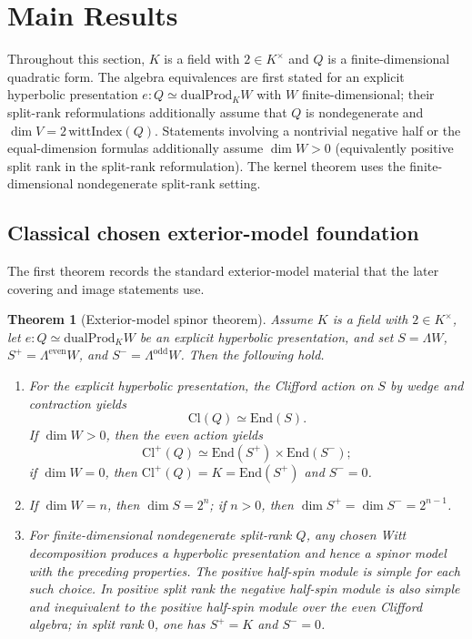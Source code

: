 \documentclass{birkjour}
\theoremstyle{plain}
\newtheorem{theorem}{Theorem}[section]
\theoremstyle{definition}
\theoremstyle{remark}
\newcommand{\Cl}{\mathrm{Cl}}
\newcommand{\End}{\mathrm{End}}
\newcommand{\dualProd}{\mathrm{dualProd}}
\newcommand{\wedgeW}{\Lambda W}
\newcommand{\wedgeEven}{\Lambda^{\mathrm{even}} W}
\newcommand{\wedgeOdd}{\Lambda^{\mathrm{odd}} W}
\begin{document}
\section{Main Results}
\label{sec:results}

Throughout this section, $K$ is a field with $2\in K^\times$ and $Q$ is a
finite-dimensional quadratic form. The algebra equivalences are first stated
for an explicit hyperbolic presentation $e:Q \simeq \dualProd_K W$ with
$W$ finite-dimensional; their split-rank reformulations additionally assume
that $Q$ is nondegenerate and $\dim V = 2\,\mathrm{wittIndex}(Q)$. Statements
involving a nontrivial negative half or the equal-dimension formulas
additionally assume $\dim W>0$ (equivalently positive split rank in the
split-rank reformulation). The kernel theorem uses the finite-dimensional
nondegenerate split-rank setting.

\subsection*{Classical chosen exterior-model foundation}

The first theorem records the standard exterior-model material that the later
covering and image statements use.

\begin{theorem}[Exterior-model spinor theorem]
\label{thm:chosen-spinor-package}
Assume $K$ is a field with $2\in K^\times$, let
$e:Q \simeq \dualProd_K W$ be an explicit hyperbolic presentation, and set
$S=\wedgeW$, $S^+=\wedgeEven$, and $S^-=\wedgeOdd$. Then the following hold.
\begin{enumerate}
\item For the explicit hyperbolic presentation, the Clifford action on $S$ by
  wedge and contraction yields
  \[
    \Cl(Q)\simeq \End(S).
  \]
  If $\dim W>0$, then the even action yields
  \[
    \Cl^+(Q)\simeq \End(S^+) \times \End(S^-);
  \]
  if $\dim W=0$, then $\Cl^+(Q)=K=\End(S^+)$ and $S^-=0$.
\item If $\dim W=n$, then $\dim S = 2^n$; if $n>0$, then
  $\dim S^+ = \dim S^- = 2^{n-1}$.
\item For finite-dimensional nondegenerate split-rank $Q$, any chosen Witt
  decomposition produces a hyperbolic presentation and hence a spinor model
  with the preceding properties. The positive half-spin module is simple for
  each such choice. In positive split rank the negative half-spin module is also
  simple and inequivalent to the positive half-spin module over the even
  Clifford algebra; in split rank $0$, one has $S^+=K$ and $S^-=0$.
\end{enumerate}
\end{theorem}
\end{document}

